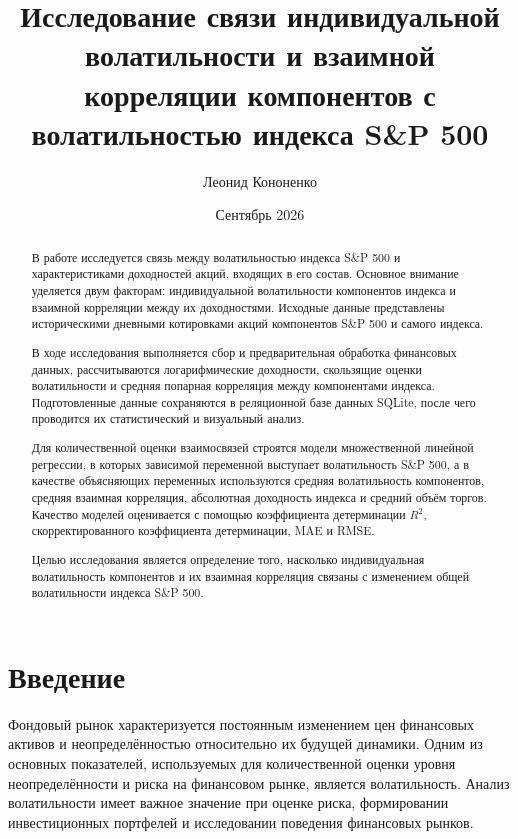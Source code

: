 \documentclass[12pt]{article}
\title{Исследование связи индивидуальной волатильности и взаимной корреляции компонентов с волатильностью индекса S\&P 500}
\author{Леонид Кононенко}
\date{Сентябрь 2026}
\begin{document}
\maketitle

\begin{abstract}

В работе исследуется связь между волатильностью индекса S\&P 500 и характеристиками доходностей акций, входящих в его состав. Основное внимание уделяется двум факторам: индивидуальной волатильности компонентов индекса и взаимной корреляции между их доходностями. Исходные данные представлены историческими дневными котировками акций компонентов S\&P 500 и самого индекса.

В ходе исследования выполняется сбор и предварительная обработка финансовых данных, рассчитываются логарифмические доходности, скользящие оценки волатильности и средняя попарная корреляция между компонентами индекса. Подготовленные данные сохраняются в реляционной базе данных SQLite, после чего проводится их статистический и визуальный анализ.

Для количественной оценки взаимосвязей строятся модели множественной линейной регрессии, в которых зависимой переменной выступает волатильность S\&P 500, а в качестве объясняющих переменных используются средняя волатильность компонентов, средняя взаимная корреляция, абсолютная доходность индекса и средний объём торгов. Качество моделей оценивается с помощью коэффициента детерминации $R^2$, скорректированного коэффициента детерминации, MAE и RMSE.

Целью исследования является определение того, насколько индивидуальная волатильность компонентов и их взаимная корреляция связаны с изменением общей волатильности индекса S\&P 500.

\end{abstract}

\newpage

\tableofcontents

\newpage

\section{Введение}

Фондовый рынок характеризуется постоянным изменением цен финансовых активов и неопределённостью относительно их будущей динамики. Одним из основных показателей, используемых для количественной оценки уровня неопределённости и риска на финансовом рынке, является волатильность. Анализ волатильности имеет важное значение при оценке риска, формировании инвестиционных портфелей и исследовании поведения финансовых рынков.
\end{document}
